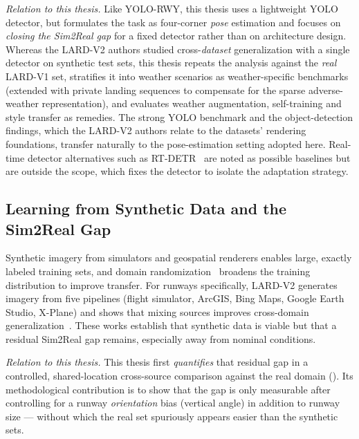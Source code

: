 \emph{Relation to this thesis.} Like YOLO-RWY, this thesis uses a lightweight YOLO
detector, but formulates the task as four-corner \emph{pose} estimation and focuses on
\emph{closing the Sim2Real gap} for a fixed detector rather than on architecture design.
Whereas the LARD-V2 authors studied cross-\emph{dataset} generalization with a single
detector on synthetic test sets, this thesis repeats the analysis against the
\emph{real} LARD-V1 set, stratifies it into weather scenarios as weather-specific
benchmarks (extended with private landing sequences to compensate for the sparse
adverse-weather representation), and evaluates weather augmentation, self-training and
style transfer as remedies. The strong YOLO benchmark and the object-detection findings,
which the LARD-V2 authors relate to the datasets' rendering foundations, transfer
naturally to the pose-estimation setting adopted here. Real-time detector alternatives
such as RT-DETR~\cite{rtdetr2024} are noted as possible baselines but are outside the
scope, which fixes the detector to isolate the adaptation strategy.

\subsection{Learning from Synthetic Data and the Sim2Real Gap}
\label{subsec:rw-sim2real}
Synthetic imagery from simulators and geospatial renderers enables large, exactly
labeled training sets, and domain randomization~\cite{tobin2017domainrand} broadens the
training distribution to improve transfer. For runways specifically, LARD-V2 generates
imagery from five pipelines (flight simulator, ArcGIS, Bing Maps, Google Earth Studio,
X-Plane) and shows that mixing sources improves cross-domain
generalization~\cite{syntheticrunway2025}. These works establish that synthetic data is
viable but that a residual Sim2Real gap remains, especially away from nominal
conditions.

\emph{Relation to this thesis.} This thesis first \emph{quantifies} that residual gap
in a controlled, shared-location cross-source comparison against the real domain
(). Its methodological contribution is to show that the gap is only
measurable after controlling for a runway \emph{orientation} bias (vertical angle) in
addition to runway size --- without which the real set spuriously appears easier than
the synthetic sets.

